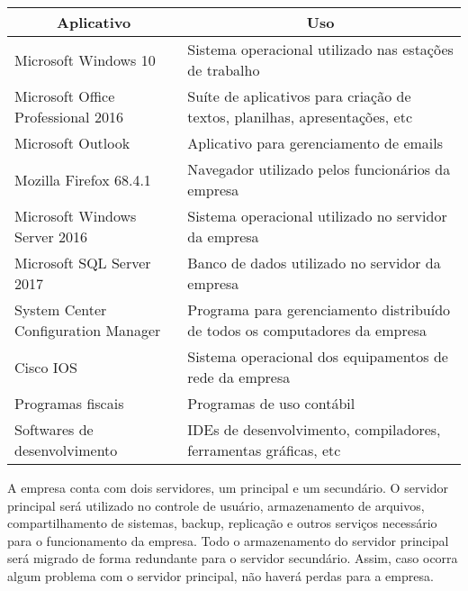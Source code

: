 \documentclass[	DIV=calc,%
							paper=a4,%
							fontsize=12pt,%
							onecolumn]{scrartcl}	 					%
\begin{document}
\begin{table}[]
	\begin{tabular}{|l|l|}
		\hline
		\multicolumn{1}{|c|}{\textbf{Aplicativo}} & \multicolumn{1}{c|}{\textbf{Uso}}                                           \\ \hline
		Microsoft Windows 10                      & Sistema operacional utilizado nas estações de trabalho                      \\ \hline
		Microsoft Office Professional 2016        & Suíte de aplicativos para criação de textos, planilhas, apresentações, etc  \\ \hline
		Microsoft Outlook                         & Aplicativo para gerenciamento de emails                                     \\ \hline
		Mozilla Firefox 68.4.1                    & Navegador utilizado pelos funcionários da empresa                           \\ \hline
		Microsoft Windows Server 2016             & Sistema operacional utilizado no servidor da empresa                        \\ \hline
		Microsoft SQL Server 2017                 & Banco de dados utilizado no servidor da empresa                             \\ \hline
		System Center Configuration Manager       & Programa para gerenciamento distribuído de todos os computadores da empresa \\ \hline
		Cisco IOS                                 & Sistema operacional dos equipamentos de rede da empresa                     \\ \hline
		Programas fiscais                         & Programas de uso contábil                                                   \\ \hline
		Softwares de desenvolvimento              & IDEs de desenvolvimento, compiladores, ferramentas gráficas, etc            \\ \hline
	\end{tabular}
\end{table}

A empresa conta com dois servidores, um principal e um secundário. O servidor principal será utilizado no controle de usuário, armazenamento de arquivos, compartilhamento de sistemas, backup, replicação e outros serviços necessário para o funcionamento da empresa. Todo o armazenamento do servidor principal será migrado de forma redundante para o servidor secundário. Assim, caso ocorra algum problema com o servidor principal, não haverá perdas para a empresa.
\end{document}
